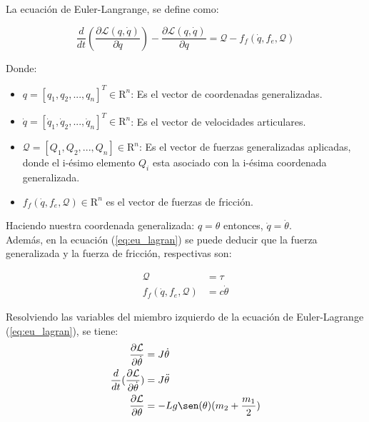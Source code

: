 \documentclass[12pt]{article}
\begin{document}
La ecuación de Euler-Langrange, se define como:

\begin{equation}
    \frac{d}{dt}(\frac{\partial \mathcal{L}(q,\dot{q})}{\partial\dot{q}})-\frac{\partial \mathcal{L}(q,\dot{q})}{\partial q}=\mathcal{Q}-f_f(\dot{q},f_e,\mathcal{Q})
    \label{eq:eu_lagran}
\end{equation}

Donde:

\begin{itemize}
    \item $q=[q_1,q_2,...,q_n]^T\in \mathrm{R}^n$: Es el vector de  coordenadas generalizadas.
    \item $\dot{q}=[\dot{q}_1,\dot{q}_2,...,\dot{q}_n]^T\in \mathrm{R}^n$: Es el vector de velocidades articulares.
    \item $\mathcal{Q}=[Q_1,Q_2,...,Q_n]\in \mathrm{R}^n$: Es el vector de fuerzas generalizadas aplicadas, donde el i-ésimo elemento $Q_i$ esta asociado con la i-ésima coordenada generalizada.
    \item $f_f(\dot{q},f_e,\mathcal{Q})\in \mathrm{R}^n$ es el vector de fuerzas de fricción.
\end{itemize}

Haciendo nuestra coordenada generalizada: $q={\theta}$ entonces,  $\dot{q}=\dot{\theta}$.
\\
Además, en la ecuación (\ref{eq:eu_lagran}) se puede deducir que la fuerza generalizada y la fuerza de fricción, respectivas son:

\begin{equation}
\begin{split}
    \mathcal{Q}&=\tau
    \\
    f_f(\dot{q},f_e,\mathcal{Q})&=c\dot{\theta}
\end{split}  
\label{eq:Q}
\end{equation}

Resolviendo las variables del miembro izquierdo de la ecuación de Euler-Lagrange (\ref{eq:eu_lagran}), se tiene:
\begin{equation}
    \begin{split}
        \frac{\partial \mathcal{L}}{\partial\dot{\theta}}&=J\dot{\theta}\\
        \frac{d}{dt}(\frac{\partial\mathcal{L}}{\partial\dot{\theta}})&=J\ddot{\theta}\\
        \frac{\partial \mathcal{L}}{\partial \theta }&=-Lg\sen(\theta)(m_2 + \frac{m_1}{2})\\
    \end{split}
    \label{eq:dq}
\end{equation}
\end{document}
